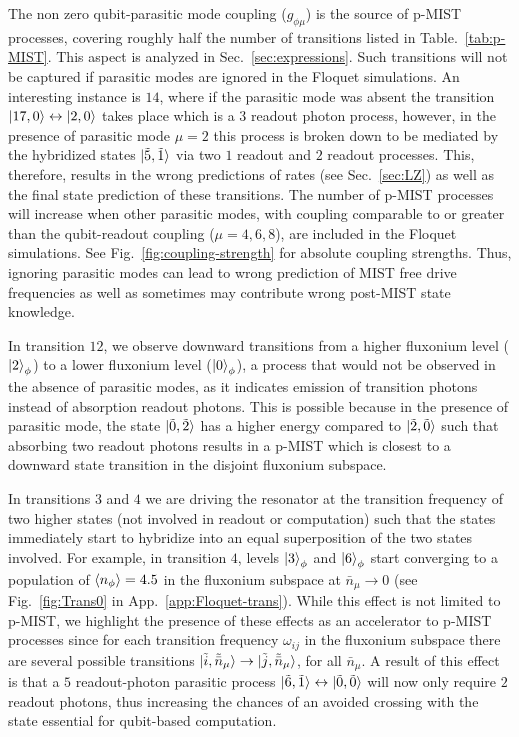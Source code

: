 \documentclass[%
reprint,
superscriptaddress,
 amsmath,amssymb,
 aps,
 prx,
longbibliography,
floatfix,
]{revtex4-2}
\begin{document}
The non zero qubit-parasitic mode coupling ($g_{\phi\mu}$) is the source of p-MIST processes, covering roughly half the number of transitions listed in Table.~\ref{tab:p-MIST}. This aspect is analyzed in Sec.~\ref{sec:expressions}. Such transitions will not be captured if parasitic modes are ignored in the Floquet simulations. An interesting instance is $14$, where if the parasitic mode was absent the transition $\ket{17,0}\leftrightarrow \ket{2,0}$ takes place which is a $3$ readout photon process, however, in the presence of parasitic mode $\mu=2$ this process is broken down to be mediated by the hybridized states $\ket{\tilde{5},\tilde{1}}$ via two $1$ readout and $2$ readout processes. This, therefore, results in the wrong predictions of rates (see Sec.~\ref{sec:LZ}) as well as the final state prediction of these transitions. The number of p-MIST processes will increase when other parasitic modes, with coupling comparable to or greater than the qubit-readout coupling ($\mu = 4, 6,8$), are included in the Floquet simulations. See Fig.~\ref{fig:coupling-strength} for absolute coupling strengths. Thus, ignoring parasitic modes can lead to wrong prediction of MIST free drive frequencies as well as sometimes may contribute wrong post-MIST state knowledge.

In transition $12$, we observe downward transitions from a higher fluxonium level ($\ket{2}_\phi$) to a lower fluxonium level ($\ket{0}_\phi$), a process that would not be observed in the absence of parasitic modes, as it indicates emission of transition photons instead of absorption readout photons. This is possible because in the presence of parasitic mode, the state $\ket{\tilde{0},\tilde{2}}$ has a higher energy compared to $\ket{\tilde{2},\tilde{0}}$ such that absorbing two readout photons results in a p-MIST which is closest to a downward state transition in the disjoint fluxonium subspace. 

In transitions $3$ and $4$ we are driving the resonator at the transition frequency of two higher states (not involved in readout or computation) such that the states immediately start to hybridize into an equal superposition of the two states involved. For example, in transition $4$, levels $\ket{3}_\phi$ and $\ket{6}_\phi$ start converging to a population of $\braket{n_\phi}=4.5$ in the fluxonium subspace at $\bar n_\mu\rightarrow 0$ (see Fig.~\ref{fig:Trans0} in App.~\ref{app:Floquet-trans}). While this effect is not limited to p-MIST, we highlight the presence of these effects as an accelerator to p-MIST processes since for each transition frequency $\omega_{ij}$ in the fluxonium subspace there are several possible transitions $\ket{\tilde{i},\tilde{\bar n}_\mu}\rightarrow \ket{\tilde{j},\tilde{\bar n}_\mu}$, for all $\bar n_\mu$. A result of this effect is that a $5$ readout-photon parasitic process $\ket{\tilde{6},\tilde{1}}\leftrightarrow\ket{\tilde{0},\tilde{0}}$ will now only require $2$ readout photons, thus increasing the chances of an avoided crossing with the state essential for qubit-based computation.
\end{document}
